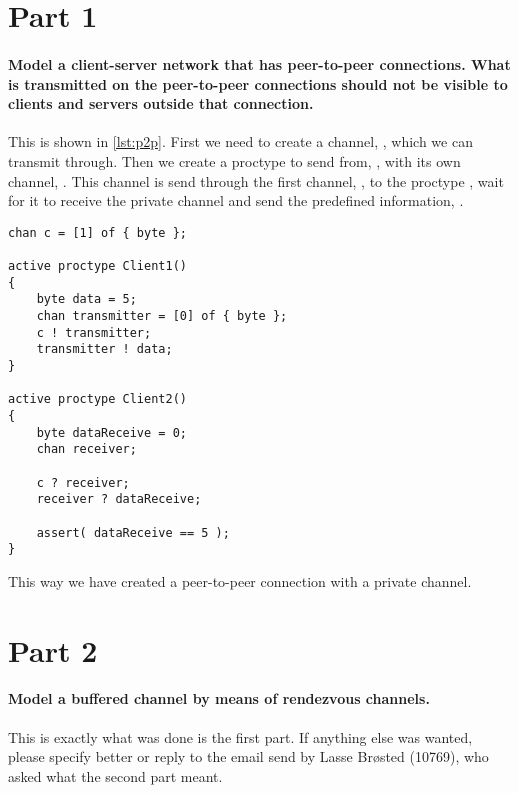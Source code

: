 \documentclass[Main]{subfiles}
\begin{document}
\section*{Part 1}
\paragraph{Model a client-server network that has peer-to-peer connections.
What is transmitted on the peer-to-peer connections should not be visible to clients and servers outside that connection.}

This is shown in \codeTitle \ref{lst:p2p}.
First we need to create a channel, , which we can transmit through.
Then we create a proctype to send from, , with its own channel, .
This channel is send through the first channel, , to the proctype , wait for it to receive the private channel and send the predefined information, .

\begin{lstlisting}[caption=Peer-to-peer network, style=Code-C, label=lst:p2p]
chan c = [1] of { byte }; 

active proctype Client1()
{
	byte data = 5;
	chan transmitter = [0] of { byte }; 
	c ! transmitter;
	transmitter ! data;
}

active proctype Client2()
{
	byte dataReceive = 0;
	chan receiver;

	c ? receiver;
	receiver ? dataReceive;
	
	assert( dataReceive == 5 );
}
\end{lstlisting}
This way we have created a peer-to-peer connection with a private channel.




\section*{Part 2}
\paragraph{Model a buffered channel by means of rendezvous channels.}

This is exactly what was done is the first part.
If anything else was wanted, please specify better or reply to the email send by Lasse Brøsted (10769), who asked what the second part meant.
\end{document}
